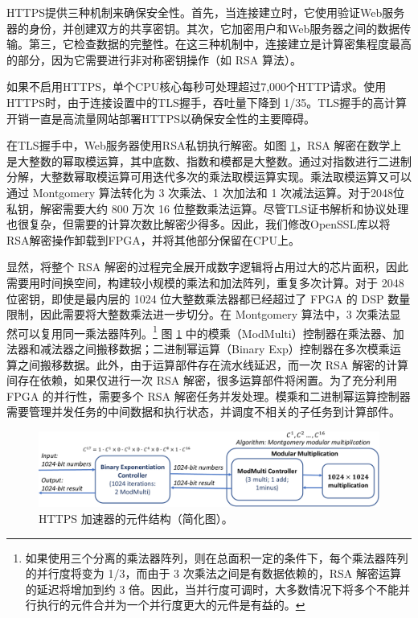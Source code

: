 HTTPS提供三种机制来确保安全性。首先，当连接建立时，它使用验证Web服务器的身份，并创建双方的共享密钥。其次，它加密用户和Web服务器之间的数据传输。第三，它检查数据的完整性。在这三种机制中，连接建立是计算密集程度最高的部分，因为它需要进行非对称密钥操作（如 RSA 算法）。

如果不启用HTTPS，单个CPU核心每秒可处理超过7,000个HTTP请求。使用HTTPS时，由于连接设置中的TLS握手，吞吐量下降到 1/35。TLS握手的高计算开销一直是高流量网站部署HTTPS以确保安全性的主要障碍。

在TLS握手中，Web服务器使用RSA私钥执行解密。如图 \ref{clicknp:fig:https-accelerator}，RSA 解密在数学上是大整数的幂取模运算，其中底数、指数和模都是大整数。通过对指数进行二进制分解，大整数幂取模运算可用迭代多次的乘法取模运算实现。乘法取模运算又可以通过 Montgomery 算法转化为 3 次乘法、1 次加法和 1 次减法运算。对于2048位私钥，解密需要大约 800 万次 16 位整数乘法运算。尽管TLS证书解析和协议处理也很复杂，但需要的计算次数比解密少得多。因此，我们修改OpenSSL库以将RSA解密操作卸载到FPGA，并将其他部分保留在CPU上。

显然，将整个 RSA 解密的过程完全展开成数字逻辑将占用过大的芯片面积，因此需要用时间换空间，构建较小规模的乘法和加法阵列，重复多次计算。对于 2048 位密钥，即使是最内层的 1024 位大整数乘法器都已经超过了 FPGA 的 DSP 数量限制，因此需要将大整数乘法进一步切分。在 Montgomery 算法中，3 次乘法显然可以复用同一乘法器阵列。\footnote{如果使用三个分离的乘法器阵列，则在总面积一定的条件下，每个乘法器阵列的并行度将变为 1/3，而由于 3 次乘法之间是有数据依赖的，RSA 解密运算的延迟将增加到约 3 倍。因此，当并行度可调时，大多数情况下将多个不能并行执行的元件合并为一个并行度更大的元件是有益的。} 图 \ref{clicknp:fig:https-accelerator} 中的模乘（ModMulti）控制器在乘法器、加法器和减法器之间搬移数据；二进制幂运算（Binary Exp）控制器在多次模乘运算之间搬移数据。此外，由于运算部件存在流水线延迟，而一次 RSA 解密的计算间存在依赖，如果仅进行一次 RSA 解密，很多运算部件将闲置。为了充分利用 FPGA 的并行性，需要多个 RSA 解密任务并发处理。模乘和二进制幂运算控制器需要管理并发任务的中间数据和执行状态，并调度不相关的子任务到计算部件。

\begin{figure}[htbp]
	\centering
	\includegraphics[width=1.0\textwidth]{image/https_accelerator}
	\caption{HTTPS 加速器的元件结构（简化图）。}
	\label{clicknp:fig:https-accelerator}
\end{figure}

